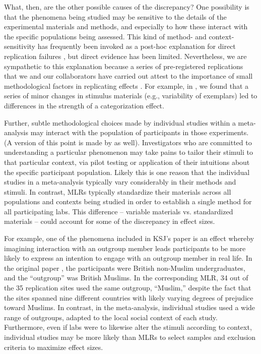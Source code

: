 \documentclass[man,floatsintext]{apa7}
\begin{document}
What, then, are the other possible causes of the discrepancy? One possibility is that the phenomena being studied may be sensitive to the details of the experimental materials and methods, and especially to how these interact with the specific populations being assessed. This kind of method- and context-sensitivity has frequently been invoked as a post-hoc explanation for direct replication failures \parencite{van2016contextual}, but direct evidence has been limited. Nevertheless, we are sympathetic to this explanation because a series of pre-registered replications that we and our collaborators have carried out attest to the importance of small methodological factors in replicating effects \parencite{lewis2018still,lewis2016understanding,phillips2015second}. For example, in \cite{lewis2016understanding}, we found that a series of minor changes in stimulus materials (e.g., variability of exemplars) led to differences in the strength of a categorization effect. 


Further, subtle methodological choices made by individual studies within a meta-analysis may interact with the population of participants in those experiments. (A version of this point is made by \cite{yarkoni2020} as well). Investigators who are committed to understanding a particular phenomenon may take pains to tailor their stimuli to that particular context, via pilot testing or application of their intuitions about the specific participant population. Likely this is one reason that the individual studies in a meta-analysis typically vary considerably in their methods and stimuli. In contrast, MLRs typically standardize their materials across all populations and contexts being studied in order to establish a single method for all participating labs. This difference -- variable materials vs. standardized materials -- could account for some of the discrepancy in effect sizes. 

For example, one of the phenomena included in KSJ’s paper is an effect whereby imagining interaction with an outgroup member leads participants to be more likely to express an intention to engage with an outgroup member in real life. In the original paper \parencite{husnu2010elaboration}, the participants were British non-Muslim undergraduates, and the “outgroup” was British Muslims. In the corresponding MLR, 34 out of the 35 replication sites used the same outgroup, “Muslim,” despite the fact that the sites spanned nine different countries with likely varying degrees of prejudice toward Muslims. In contrast, in the meta-analysis, individual studies used a wide range of outgroups, adapted to the local social context of each study. Furthermore, even if labs were to likewise alter the stimuli according to context, individual studies may be more likely than MLRs to select samples and exclusion criteria to maximize effect sizes.
\end{document}
